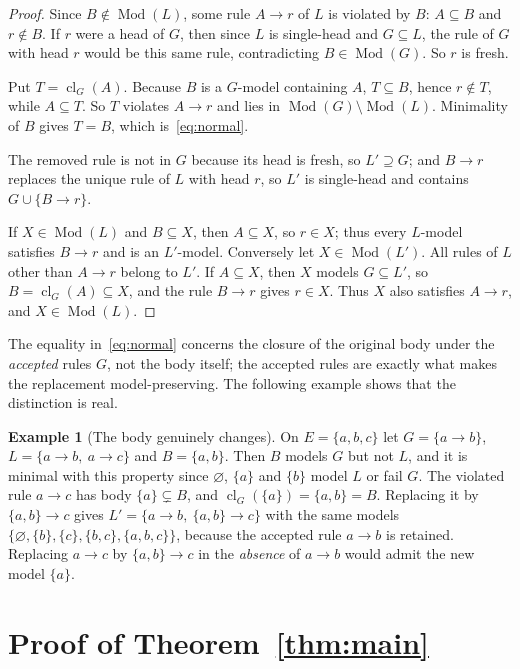 \documentclass[11pt,a4paper]{article}
\theoremstyle{plain}
\theoremstyle{definition}
\newtheorem{example}[theorem]{Example}
\theoremstyle{remark}
\newcommand{\Mod}{\operatorname{Mod}}
\newcommand{\cl}{\operatorname{cl}}
\begin{document}
\begin{proof}
Since $B\notin\Mod(L)$, some rule $A\to r$ of $L$ is violated by $B$: $A\subseteq B$ and $r\notin B$. If $r$ were a head of $G$, then since $L$ is single-head and $G\subseteq L$, the rule of $G$ with head $r$ would be this same rule, contradicting $B\in\Mod(G)$. So $r$ is fresh.

Put $T=\cl_G(A)$. Because $B$ is a $G$-model containing $A$, $T\subseteq B$, hence $r\notin T$, while $A\subseteq T$. So $T$ violates $A\to r$ and lies in $\Mod(G)\setminus\Mod(L)$. Minimality of $B$ gives $T=B$, which is~\eqref{eq:normal}.

The removed rule is not in $G$ because its head is fresh, so $L'\supseteq G$; and $B\to r$ replaces the unique rule of $L$ with head $r$, so $L'$ is single-head and contains $G\cup\{B\to r\}$.

If $X\in\Mod(L)$ and $B\subseteq X$, then $A\subseteq X$, so $r\in X$; thus every $L$-model satisfies $B\to r$ and is an $L'$-model. Conversely let $X\in\Mod(L')$. All rules of $L$ other than $A\to r$ belong to $L'$. If $A\subseteq X$, then $X$ models $G\subseteq L'$, so $B=\cl_G(A)\subseteq X$, and the rule $B\to r$ gives $r\in X$. Thus $X$ also satisfies $A\to r$, and $X\in\Mod(L)$.
\end{proof}

The equality in~\eqref{eq:normal} concerns the closure of the original body under the \emph{accepted} rules $G$, not the body itself; the accepted rules are exactly what makes the replacement model-preserving. The following example shows that the distinction is real.

\begin{example}[The body genuinely changes]\label{ex:fixture}
On $E=\{a,b,c\}$ let $G=\{a\to b\}$, $L=\{a\to b,\ a\to c\}$ and $B=\{a,b\}$. Then $B$ models $G$ but not $L$, and it is minimal with this property since $\varnothing$, $\{a\}$ and $\{b\}$ model $L$ or fail $G$. The violated rule $a\to c$ has body $\{a\}\subsetneq B$, and $\cl_G(\{a\})=\{a,b\}=B$. Replacing it by $\{a,b\}\to c$ gives $L'=\{a\to b,\ \{a,b\}\to c\}$ with the same models $\{\varnothing,\{b\},\{c\},\{b,c\},\{a,b,c\}\}$, because the accepted rule $a\to b$ is retained. Replacing $a\to c$ by $\{a,b\}\to c$ in the \emph{absence} of $a\to b$ would admit the new model $\{a\}$.
\end{example}

\section{Proof of Theorem~\ref{thm:main}}\label{sec:proof}
\end{document}

